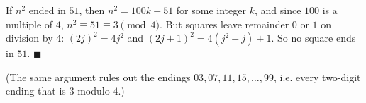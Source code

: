 If $n^2$ ended in $51$, then $n^2=100k+51$ for some integer $k$, and since $100$ is a multiple of $4$, $n^2\equiv51\equiv3\pmod4$. But squares leave remainder $0$ or $1$ on division by $4$: $(2j)^2=4j^2$ and $(2j+1)^2=4(j^2+j)+1$. So no square ends in $51$. $\blacksquare$

(The same argument rules out the endings $03,07,11,15,\dots,99$, i.e. every two-digit ending that is $3$ modulo $4$.)
